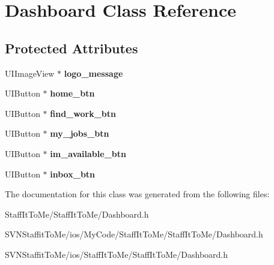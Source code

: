 \hypertarget{interface_dashboard}{
\section{\-Dashboard \-Class \-Reference}
\label{interface_dashboard}
}
\subsection*{\-Protected \-Attributes}
\begin{DoxyCompactItemize}
\item 
\hypertarget{interface_dashboard_a2f4b17a70f41b95e41ba692281dec594}{
\-U\-I\-Image\-View $\ast$ {\bfseries logo\-\_\-message}}
\label{interface_dashboard_a2f4b17a70f41b95e41ba692281dec594}

\item 
\hypertarget{interface_dashboard_abdca5129451cd119c097f226e9648c16}{
\-U\-I\-Button $\ast$ {\bfseries home\-\_\-btn}}
\label{interface_dashboard_abdca5129451cd119c097f226e9648c16}

\item 
\hypertarget{interface_dashboard_a7bc800e844f2f17696551fd254b699d7}{
\-U\-I\-Button $\ast$ {\bfseries find\-\_\-work\-\_\-btn}}
\label{interface_dashboard_a7bc800e844f2f17696551fd254b699d7}

\item 
\hypertarget{interface_dashboard_a74de1257997119f5200e17b4d02dbcda}{
\-U\-I\-Button $\ast$ {\bfseries my\-\_\-jobs\-\_\-btn}}
\label{interface_dashboard_a74de1257997119f5200e17b4d02dbcda}

\item 
\hypertarget{interface_dashboard_ab7e193997195b8a1f59044cdc9b46a67}{
\-U\-I\-Button $\ast$ {\bfseries im\-\_\-available\-\_\-btn}}
\label{interface_dashboard_ab7e193997195b8a1f59044cdc9b46a67}

\item 
\hypertarget{interface_dashboard_a66a8724ecf0f11423ec93cfc742e0dda}{
\-U\-I\-Button $\ast$ {\bfseries inbox\-\_\-btn}}
\label{interface_dashboard_a66a8724ecf0f11423ec93cfc742e0dda}

\end{DoxyCompactItemize}


\-The documentation for this class was generated from the following files\-:\begin{DoxyCompactItemize}
\item 
\-Staff\-It\-To\-Me/\-Staff\-It\-To\-Me/\-Dashboard.\-h\item 
\-S\-V\-N\-Staffit\-To\-Me/ios/\-My\-Code/\-Staff\-It\-To\-Me/\-Staff\-It\-To\-Me/\-Dashboard.\-h\item 
\-S\-V\-N\-Staffit\-To\-Me/ios/\-Staff\-It\-To\-Me/\-Staff\-It\-To\-Me/\-Dashboard.\-h\end{DoxyCompactItemize}
